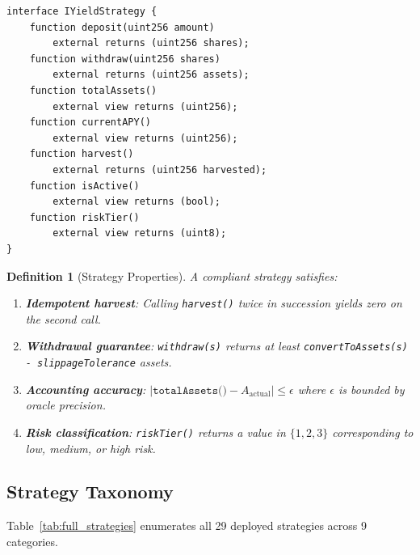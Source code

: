 \documentclass[11pt,twocolumn]{article}
\newtheorem{definition}{Definition}[section]
\begin{document}
\begin{lstlisting}[language=Solidity,caption=IYieldStrategy interface]
interface IYieldStrategy {
    function deposit(uint256 amount)
        external returns (uint256 shares);
    function withdraw(uint256 shares)
        external returns (uint256 assets);
    function totalAssets()
        external view returns (uint256);
    function currentAPY()
        external view returns (uint256);
    function harvest()
        external returns (uint256 harvested);
    function isActive()
        external view returns (bool);
    function riskTier()
        external view returns (uint8);
}
\end{lstlisting}

\begin{definition}[Strategy Properties]
A compliant strategy satisfies:
\begin{enumerate}[nosep]
  \item \textbf{Idempotent harvest}: Calling \texttt{harvest()} twice in succession yields zero on the second call.
  \item \textbf{Withdrawal guarantee}: \texttt{withdraw(s)} returns at least \texttt{convertToAssets(s) - slippageTolerance} assets.
  \item \textbf{Accounting accuracy}: $|\texttt{totalAssets()} - A_{\text{actual}}| \leq \epsilon$ where $\epsilon$ is bounded by oracle precision.
  \item \textbf{Risk classification}: \texttt{riskTier()} returns a value in $\{1, 2, 3\}$ corresponding to low, medium, or high risk.
\end{enumerate}
\end{definition}

\subsection{Strategy Taxonomy}\label{sec:taxonomy}

Table~\ref{tab:full_strategies} enumerates all 29 deployed strategies across 9 categories.
\end{document}

